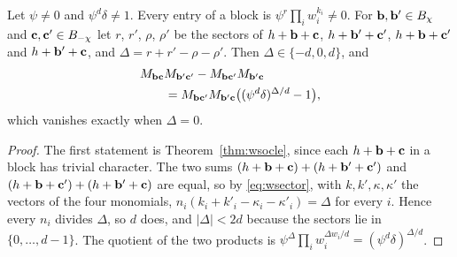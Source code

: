 \begin{lemma}\label{lem:wminor}
Let $\psi\ne0$ and $\psi^d\delta\ne1$. Every entry of a block is
$\psi^r\prod_iw_i^{k_i}\ne0$. For $\mathbf{b},\mathbf{b}'\in B_\chi$ and
$\mathbf{c},\mathbf{c}'\in B_{-\chi}$ let $r$, $r'$, $\rho$, $\rho'$ be the sectors of
$h+\mathbf{b}+\mathbf{c}$, $h+\mathbf{b}'+\mathbf{c}'$, $h+\mathbf{b}+\mathbf{c}'$ and $h+\mathbf{b}'+\mathbf{c}$, and
$\Delta=r+r'-\rho-\rho'$. Then $\Delta\in\{-d,0,d\}$, and
\[
\begin{aligned}
&M_{\mathbf{b}\mathbf{c}}M_{\mathbf{b}'\mathbf{c}'}-M_{\mathbf{b}\mathbf{c}'}M_{\mathbf{b}'\mathbf{c}}\\
&\qquad=M_{\mathbf{b}\mathbf{c}'}M_{\mathbf{b}'\mathbf{c}}\big((\psi^d\delta)^{\Delta/d}-1\big),
\end{aligned}
\]
which vanishes exactly when $\Delta=0$.
\end{lemma}

\begin{proof}
The first statement is Theorem~\ref{thm:wsocle}, since each
$h+\mathbf{b}+\mathbf{c}$ in a block has trivial character. The two sums
$(h+\mathbf{b}+\mathbf{c})+(h+\mathbf{b}'+\mathbf{c}')$ and $(h+\mathbf{b}+\mathbf{c}')+(h+\mathbf{b}'+\mathbf{c})$ are equal, so
by \eqref{eq:wsector}, with $k,k',\kappa,\kappa'$ the vectors of the four
monomials, $n_i(k_i+k'_i-\kappa_i-\kappa'_i)=\Delta$ for every $i$. Hence
every $n_i$ divides $\Delta$, so $d$ does, and $|\Delta|<2d$ because the
sectors lie in $\{0,\dots,d-1\}$. The quotient of the two products is
$\psi^{\Delta}\prod_iw_i^{\Delta w_i/d}=(\psi^d\delta)^{\Delta/d}$.
\end{proof}

